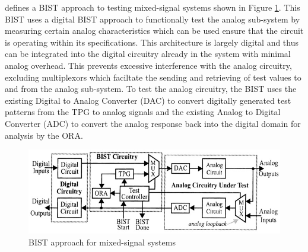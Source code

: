 \documentclass[12pt]{report}
\begin{document}
\cite{stroud} defines a BIST approach to testing mixed-signal systems shown in Figure \ref{fig:mixedbist1}.  This BIST uses a digital BIST approach to functionally test the analog sub-system by measuring certain analog characteristics which can be used ensure that the circuit is operating within its specifications.  This architecture is largely digital and thus can be integrated into the digital circuitry already in the system with minimal analog overhead.  This prevents excessive interference with the analog circuitry, excluding multiplexors which faciltate the sending and retrieving of test values to and from the analog sub-system\cite{stroud}.  To test the analog circuitry, the BIST uses the existing Digital to Analog Converter (DAC) to convert digitally generated test patterns from the TPG to analog signals and the existing Analog to Digital Converter (ADC) to convert the analog response back into the digital domain for analysis by the ORA\cite{stroud}.
\begin{figure}
	\begin{center}
		\includegraphics[scale=1]{images/mixed-bist-architecture}
	\end{center}
	\caption{BIST approach for mixed-signal systems\cite{stroud}}
	\label{fig:mixedbist1}
\end{figure}
\end{document}
